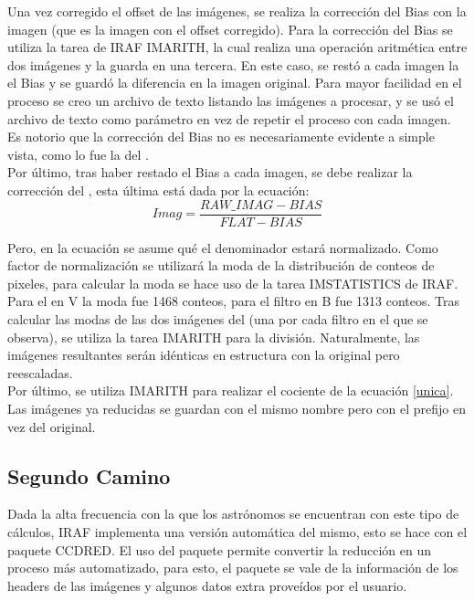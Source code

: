 \documentclass[12pt]{article}
\begin{document}
Una vez corregido el offset de las imágenes, se realiza la corrección del Bias con la imagen  (que es la imagen  con el offset corregido). Para la corrección del Bias se utiliza la tarea de IRAF IMARITH, la cual realiza una operación aritmética entre dos imágenes y la guarda en una tercera. En este caso, se restó a cada imagen la el Bias  y se guardó la diferencia en la imagen original. Para mayor facilidad en el proceso se creo un archivo de texto listando las imágenes a procesar, y se usó el archivo de texto como parámetro en vez de repetir el proceso con cada imagen. Es notorio que la corrección del Bias no es necesariamente evidente a simple vista, como lo fue la del .\\

Por último, tras haber restado el Bias a cada imagen, se debe realizar la corrección del , esta última está dada por la ecuación:
\begin{equation}
Imag = \frac{RAW\_IMAG - BIAS}{FLAT - BIAS}
\label{unica}
\end{equation}

Pero, en la ecuación se asume qué el denominador estará normalizado. Como factor de normalización se utilizará la moda de la distribución de conteos de pixeles, para calcular la moda se hace uso de la tarea IMSTATISTICS de IRAF. Para el  en V la moda fue 1468 conteos, para el filtro en B fue 1313 conteos. Tras calcular las modas de las dos imágenes del  (una por cada filtro en el que se observa), se utiliza la tarea IMARITH para la división. Naturalmente, las imágenes resultantes serán idénticas en estructura con la original pero reescaladas.\\

Por último, se utiliza IMARITH para realizar el cociente de la ecuación \ref{unica}. Las imágenes ya reducidas se guardan con el mismo nombre pero con el prefijo  en vez del  original.

\subsection{Segundo Camino}
Dada la alta frecuencia con la que los astrónomos se encuentran con este tipo de cálculos, IRAF implementa una versión automática del mismo, esto se hace con el paquete CCDRED. El uso del paquete permite convertir la reducción en un proceso más automatizado, para esto, el paquete se vale de la información de los headers de las imágenes y algunos datos extra proveídos por el usuario.\\
\end{document}
